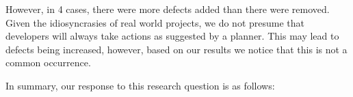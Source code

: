 However, in 4 cases, there were more defects added than there were removed. Given the idiosyncrasies  of real world projects, we do not presume that developers will always take actions as suggested by a planner. This may lead to defects being increased, however, based on our results we notice that this is not a common occurrence.


In summary, our response to this research question is as follows:\\



% 






